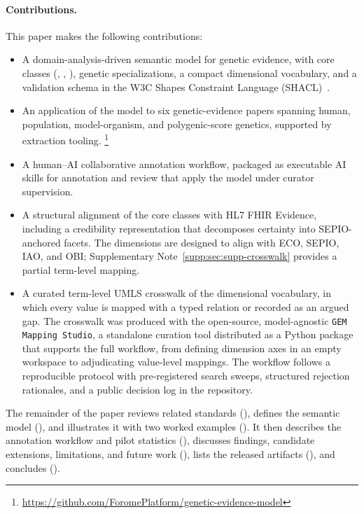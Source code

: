 \paragraph{Contributions.} This paper makes the following contributions:
\begin{itemize}
    \item A domain-analysis-driven semantic model for genetic evidence, with
    core classes (\ScientificEvidence, \EvidenceVariable,
    \EvidenceAssertion), genetic specializations, a compact dimensional
    vocabulary, and a validation schema in the W3C Shapes Constraint
    Language (SHACL)~\cite{w3c-shacl}.
    \item An application of the model to six genetic-evidence papers spanning
        human, population, model-organism, and polygenic-score genetics,
        supported by extraction tooling.
    \footnote{\url{https://github.com/ForomePlatform/genetic-evidence-model}}
    \item A human--AI collaborative annotation workflow, packaged as executable
        AI skills for annotation and review that apply the model under curator
        supervision.
    \item A structural alignment of the core classes with HL7 FHIR Evidence,
        including a credibility representation that decomposes certainty into
        SEPIO-anchored facets. The dimensions are designed to align with ECO,
        SEPIO, IAO, and OBI; Supplementary Note~\ref*{supp:sec:supp-crosswalk} provides a partial
        term-level mapping.
    \item A curated term-level UMLS crosswalk of the dimensional vocabulary, in
        which every value is mapped with a typed relation or recorded as an
        argued gap. The crosswalk was produced with the open-source,
        model-agnostic \texttt{GEM Mapping Studio}, a standalone curation tool
        distributed as a Python package that supports the full workflow, from
        defining dimension axes in an empty workspace to adjudicating
        value-level mappings. The workflow follows a reproducible protocol with
        pre-registered search sweeps, structured rejection rationales, and a
        public decision log in the repository.
\end{itemize}

The remainder of the paper reviews related standards
(), defines the semantic model
(), and illustrates it with two worked examples
(). It then describes the annotation workflow and
pilot statistics (), discusses findings, candidate
extensions, limitations, and future work (), lists
the released artifacts (), and concludes
().
